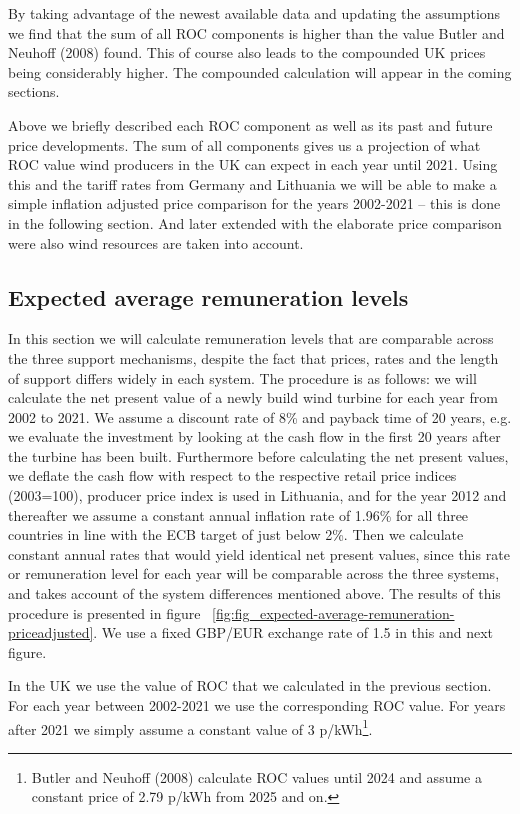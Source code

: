 \documentclass[a4paper, 12pt]{article}
\begin{document}
By taking advantage of the newest available data and updating the assumptions we find that the sum of all ROC components is higher than the value Butler and Neuhoff (2008) found. This of course also leads to the compounded UK prices being considerably higher. The compounded calculation will appear in the coming sections. 

Above we briefly described each ROC component as well as its past and future price developments. The sum of all components gives us a projection of what ROC value wind producers in the UK can expect in each year until 2021. Using this and the tariff rates from Germany and Lithuania we will be able to make a simple inflation adjusted price comparison for the years 2002-2021 – this is done in the following section. And later extended with the elaborate price comparison were also wind resources are taken into account.

\subsection{Expected average remuneration levels}

In this section we will calculate remuneration levels that are comparable across the three support mechanisms, despite the fact that prices, rates and the length of support differs widely in each system. The procedure is as follows: we will calculate the net present value of a newly build wind turbine for each year from 2002 to 2021. We assume a discount rate of 8\% and payback time of 20 years, e.g. we evaluate the investment by looking at the cash flow in the first 20 years after the turbine has been built. Furthermore before calculating the net present values, we deflate the cash flow with respect to the respective retail price indices (2003=100), producer price index is used in Lithuania, and for the year 2012 and thereafter we assume a constant annual inflation rate of 1.96\% for all three countries in line with the ECB target of just below 2\%. Then we calculate constant annual rates that would yield identical net present values, since this rate or remuneration level for each year will be comparable across the three systems, and takes account of the system differences mentioned above. The results of this procedure is presented in figure ~\ref{fig:fig_expected-average-remuneration-priceadjusted}. We use a fixed GBP/EUR exchange rate of 1.5 in this and next figure.

In the UK we use the value of ROC that we calculated in the previous section. For each year between 2002-2021 we use the corresponding ROC value. For years after 2021 we simply assume a constant value of 3 p/kWh\footnote{Butler and Neuhoff (2008) calculate ROC values until 2024 and assume a constant price of 2.79 p/kWh from 2025 and on.}.
\end{document}
